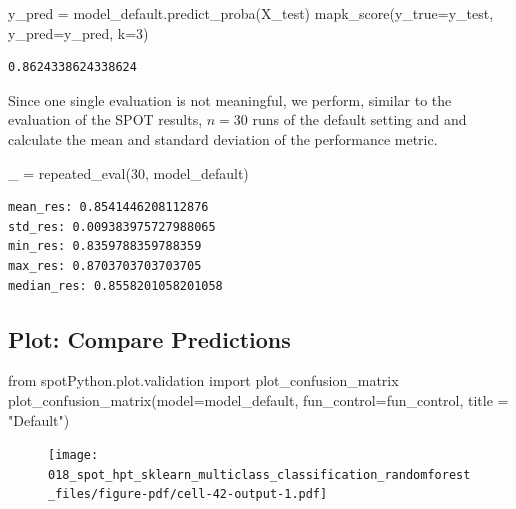 \documentclass[
  letterpaper,
  DIV=11,
  numbers=noendperiod]{scrreprt}
\newenvironment{Shaded}{\begin{snugshade}}{\end{snugshade}}
\newcommand{\DecValTok}[1]{\textcolor[rgb]{0.68,0.00,0.00}{#1}}
\newcommand{\ImportTok}[1]{\textcolor[rgb]{0.00,0.46,0.62}{#1}}
\newcommand{\NormalTok}[1]{\textcolor[rgb]{0.00,0.23,0.31}{#1}}
\newcommand{\OperatorTok}[1]{\textcolor[rgb]{0.37,0.37,0.37}{#1}}
\newcommand{\StringTok}[1]{\textcolor[rgb]{0.13,0.47,0.30}{#1}}
\begin{document}
\begin{Shaded}
\begin{Highlighting}[]
\NormalTok{y\_pred }\OperatorTok{=}\NormalTok{ model\_default.predict\_proba(X\_test)}
\NormalTok{mapk\_score(y\_true}\OperatorTok{=}\NormalTok{y\_test, y\_pred}\OperatorTok{=}\NormalTok{y\_pred, k}\OperatorTok{=}\DecValTok{3}\NormalTok{)}
\end{Highlighting}
\end{Shaded}

\begin{verbatim}
0.8624338624338624
\end{verbatim}

Since one single evaluation is not meaningful, we perform, similar to
the evaluation of the SPOT results, \(n=30\) runs of the default setting
and and calculate the mean and standard deviation of the performance
metric.

\begin{Shaded}
\begin{Highlighting}[]
\NormalTok{\_ }\OperatorTok{=}\NormalTok{ repeated\_eval(}\DecValTok{30}\NormalTok{, model\_default)}
\end{Highlighting}
\end{Shaded}

\begin{verbatim}
mean_res: 0.8541446208112876
std_res: 0.009383975727988065
min_res: 0.8359788359788359
max_res: 0.8703703703703705
median_res: 0.8558201058201058
\end{verbatim}

\hypertarget{plot-compare-predictions-1}{%
\subsection{Plot: Compare
Predictions}\label{plot-compare-predictions-1}}

\begin{Shaded}
\begin{Highlighting}[]
\ImportTok{from}\NormalTok{ spotPython.plot.validation }\ImportTok{import}\NormalTok{ plot\_confusion\_matrix}
\NormalTok{plot\_confusion\_matrix(model}\OperatorTok{=}\NormalTok{model\_default, fun\_control}\OperatorTok{=}\NormalTok{fun\_control, title }\OperatorTok{=} \StringTok{"Default"}\NormalTok{)}
\end{Highlighting}
\end{Shaded}

\begin{figure}[H]

{\centering \texttt{[image: 018\_spot\_hpt\_sklearn\_multiclass\_classification\_randomforest\_files/figure-pdf/cell-42-output-1.pdf]}

}

\end{figure}
\end{document}
